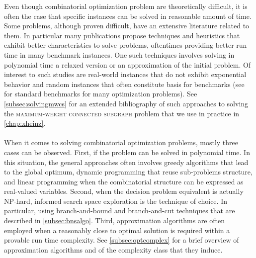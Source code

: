 	Even though combinatorial optimization problem are theoretically difficult, it is often the case that specific instances can be solved in reasonable amount of time.
	Some problems, although proven difficult, have an extensive literature related to them.
	In particular many publications propose techniques and heuristics that exhibit better characteristics to solve problems, oftentimes providing better run time in many benchmark instances.
	One such techniques involves solving in polynomial time a relaxed version or an approximation of the initial problem.
	Of interest to such studies are real-world instances that do not exhibit exponential behavior and random instances that often constitute basis for benchmarks (see  for standard benchmarks for many optimization problems).
	See \cref{subsec:solvingmwcs} for an extended bibliography of such approaches to solving the \textsc{maximum-weight connected subgraph} problem that we use in practice in \cref{chap:xheinz}.

	\paragraph{}
	When it comes to solving combinatorial optimization problems, mostly three cases can be observed.
	First, if the problem can be solved in polynomial time.
	In this situation, the general approaches often involves greedy algorithms that lead to the global optimum, dynamic programming that reuse sub-problems structure, and linear programming when the combinatorial structure can be expressed as real-valued variables.
	Second, when the decision problem equivalent is actually NP-hard, informed search space exploration is the technique of choice.
	In particular, using branch-and-bound and branch-and-cut techniques that are described in \cref{subsec:bnsalgo}.
	Third, approximation algorithms are often employed when a reasonably close to optimal solution is required within a provable run time complexity.
	See \cref{subsec:optcomplex} for a brief overview of approximation algorithms and of the complexity class that they induce.


		

